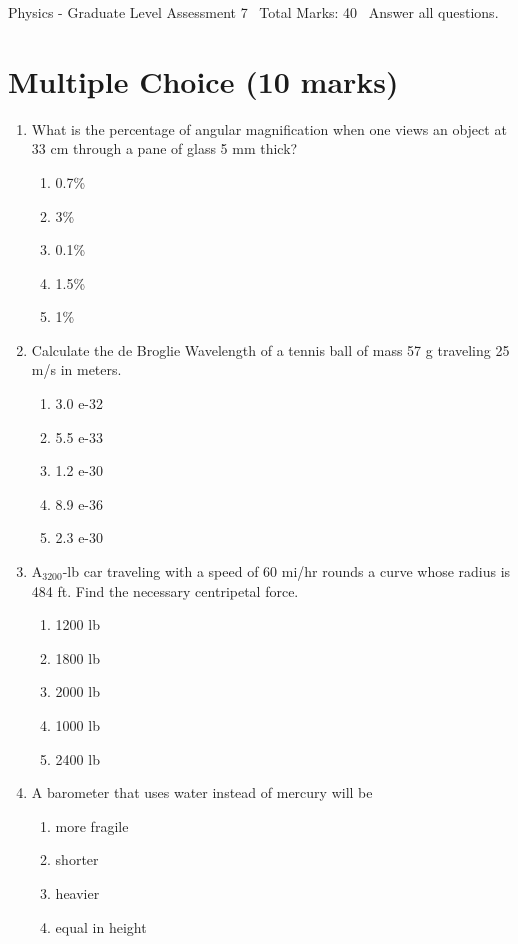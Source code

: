 \documentclass[12pt]{article}
\begin{document}
\begin{center}
Physics - Graduate Level Assessment 7 \
Total Marks: 40 \
Answer all questions.
\end{center}

\section*{Multiple Choice (10 marks)}
\begin{enumerate}[label=\arabic*.]
\item What is the percentage of angular magnification when one views an object at 33 cm through a pane of glass 5 mm thick?
\begin{enumerate}[label=(\alph*)]
    \item 0.7\%
    \item 3\%
    \item 0.1\%
    \item 1.5\%
    \item 1\%
\end{enumerate}
\item Calculate the de Broglie Wavelength of a tennis ball of mass 57 g traveling 25 m/s in meters.
\begin{enumerate}[label=(\alph*)]
    \item 3.0 e-32
    \item 5.5 e-33
    \item 1.2 e-30
    \item 8.9 e-36
    \item 2.3 e-30
\end{enumerate}
\item A$_{3200}$-lb car traveling with a speed of 60 mi/hr rounds a curve whose radius is 484 ft. Find the necessary centripetal force.
\begin{enumerate}[label=(\alph*)]
    \item 1200 lb
    \item 1800 lb
    \item 2000 lb
    \item 1000 lb
    \item 2400 lb
\end{enumerate}
\item A barometer that uses water instead of mercury will be
\begin{enumerate}[label=(\alph*)]
    \item more fragile
    \item shorter
    \item heavier
    \item equal in height

\end{enumerate}
\end{enumerate}
\end{document}
